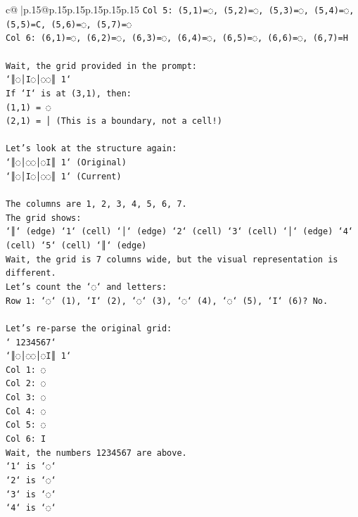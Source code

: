 \documentclass{article}
\begin{document}
{\begin{supertabular}{c@{$\;$}|p{.15\linewidth}@{}p{.15\linewidth}p{.15\linewidth}p{.15\linewidth}p{.15\linewidth}p{.15\linewidth}}
{{{\texttt{Col 5: (5,1)=◌, (5,2)=◌, (5,3)=◌, (5,4)=◌, (5,5)=C, (5,6)=◌, (5,7)=◌} \\
\texttt{Col 6: (6,1)=◌, (6,2)=◌, (6,3)=◌, (6,4)=◌, (6,5)=◌, (6,6)=◌, (6,7)=H} \\
\\ 
\texttt{Wait, the grid provided in the prompt:} \\
\texttt{`║◌│I◌│◌◌║ 1`} \\
\texttt{If `I` is at (3,1), then:} \\
\texttt{(1,1) = ◌} \\
\texttt{(2,1) = │ (This is a boundary, not a cell!)} \\
\\ 
\texttt{Let's look at the structure again:} \\
\texttt{`║◌│◌◌│◌I║ 1` (Original)} \\
\texttt{`║◌│I◌│◌◌║ 1` (Current)} \\
\\ 
\texttt{The columns are 1, 2, 3, 4, 5, 6, 7.} \\
\texttt{The grid shows:} \\
\texttt{`║` (edge) `1` (cell) `│` (edge) `2` (cell) `3` (cell) `│` (edge) `4` (cell) `5` (cell) `║` (edge)} \\
\texttt{Wait, the grid is 7 columns wide, but the visual representation is different.} \\
\texttt{Let's count the `◌` and letters:} \\
\texttt{Row 1: `◌` (1), `I` (2), `◌` (3), `◌` (4), `◌` (5), `I` (6)? No.} \\
\\ 
\texttt{Let's re{-}parse the original grid:} \\
\texttt{` 1234567`} \\
\texttt{`║◌│◌◌│◌I║ 1`} \\
\texttt{Col 1: ◌} \\
\texttt{Col 2: ◌} \\
\texttt{Col 3: ◌} \\
\texttt{Col 4: ◌} \\
\texttt{Col 5: ◌} \\
\texttt{Col 6: I} \\
\texttt{Wait, the numbers 1234567 are above.} \\
\texttt{`1` is `◌`} \\
\texttt{`2` is `◌`} \\
\texttt{`3` is `◌`} \\
\texttt{`4` is `◌`} \\
}}}
\end{supertabular}}
\end{document}
